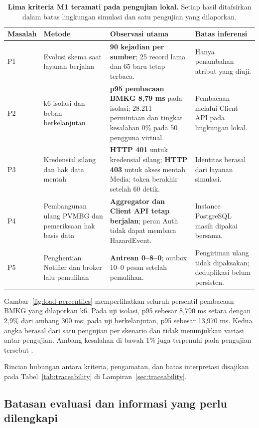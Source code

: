 \documentclass{fairmeta}
\begin{document}
\begin{table}[htbp]
\centering
\caption{\textbf{Lima kriteria M1 teramati pada pengujian lokal.} Setiap hasil ditafsirkan dalam batas lingkungan simulasi dan satu pengujian yang dilaporkan.}
\label{tab:test-summary}
\footnotesize
\begin{tabularx}{\textwidth}{@{}L{1.25cm}L{3.4cm}YL{3.2cm}@{}}
\toprule
\textbf{Masalah} & \textbf{Metode} & \textbf{Observasi utama} & \textbf{Batas inferensi}\\
\midrule
P1 & Evolusi skema saat layanan berjalan & \textbf{90 kejadian per sumber}; 25 record lama dan 65 baru tetap terbaca. & Hanya penambahan atribut yang diuji.\\
\addlinespace[3pt]
P2 & k6 isolasi dan beban berkelanjutan & \textbf{p95 pembacaan BMKG 8,79 ms} pada isolasi; 28.211 permintaan dan tingkat kesalahan 0\% pada 50 pengguna virtual. & Pembacaan melalui Client API pada lingkungan lokal.\\
\addlinespace[3pt]
P3 & Kredensial silang dan hak data mentah & \textbf{HTTP 401} untuk kredensial silang; \textbf{HTTP 403} untuk akses mentah Media; token berakhir setelah 60 detik. & Identitas berasal dari layanan simulasi.\\
\addlinespace[3pt]
P4 & Pembangunan ulang PVMBG dan pemeriksaan hak basis data & \textbf{Aggregator dan Client API tetap berjalan}; peran Auth tidak dapat membaca HazardEvent. & Instance PostgreSQL masih dipakai bersama.\\
\addlinespace[3pt]
P5 & Penghentian Notifier dan broker lalu pemulihan & \textbf{Antrean 0--8--0}; outbox 10--0 pesan setelah pemulihan. & Pengiriman ulang tidak dipaksakan; deduplikasi belum persisten.\\
\bottomrule
\end{tabularx}
\end{table}

Gambar~\ref{fig:load-percentiles} memperlihatkan seluruh persentil pembacaan BMKG yang dilaporkan k6. Pada uji isolasi, p95 sebesar 8,790 ms setara dengan 2,9\% dari ambang 300 ms; pada uji berkelanjutan, p95 sebesar 13,970 ms. Kedua angka berasal dari satu pengujian per skenario dan tidak menunjukkan variasi antar-pengujian. Ambang kesalahan di bawah 1\% juga terpenuhi pada pengujian tersebut \cite{k6-thresholds}.

Rincian hubungan antara kriteria, pengamatan, dan batas interpretasi disajikan pada Tabel~\ref{tab:traceability} di Lampiran~\ref{sec:traceability}.

\subsection{Batasan evaluasi dan informasi yang perlu dilengkapi}
\end{document}

